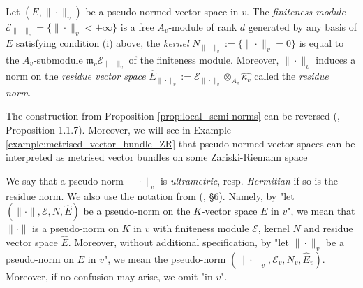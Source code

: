 \documentclass [11pt,reqno]{amsart}
\newcommand{\1}{\mathmybb{1}}
\def\cE{{\mathcal{E}}}
\def\m{\mathfrak m}
\begin{document}
\begin{proposition}
\label{prop:local_semi-norms}
Let $(E,\|\cdot\|_v)$ be a pseudo-normed vector space in $v$. The \emph{finiteness module} $\cE_{\|\cdot\|_{v}}=\{\|\cdot\|_{v}<+\infty\}$ is a free $A_v$-module of rank $d$ generated by any basis of $E$ satisfying condition (i) above, the \emph{kernel} $N_{\|\cdot\|_{v}}:=\{\|\cdot\|_{v}=0\}$ is equal to the $A_v$-submodule $\m_v\cE_{\|\cdot\|_{v}}$ of the finiteness module. Moreover, $\|\cdot\|_{v}$ induces a norm on the \emph{residue vector space} $\widehat{E}_{\|\cdot\|_{v}} := \cE_{\|\cdot\|_{v}} \otimes_{A_v} \widehat{\kappa_v}$ called the \emph{residue norm}.
\end{proposition}

\begin{remark}
\label{rem:pseudo-norm_metrised_vector_bundle}
The construction from Proposition \ref{prop:local_semi-norms} can be reversed (\cite{Sedillot_pav}, Proposition 1.1.7). Moreover, we will see in Example \ref{example:metrised_vector_bundle_ZR} that pseudo-normed vector spaces can be interpreted as metrised vector bundles on some Zariski-Riemann space
\end{remark}

We say that a pseudo-norm $\|\cdot\|_{v}$ is \emph{ultrametric}, resp. \emph{Hermitian} if so is the residue norm. We also use the notation from (\cite{Sedillot_pav}, \S 6). Namely, by "let $(\|\cdot\|,\cE,N,\widehat{E})$ be a pseudo-norm on the $K$-vector space $E$ in $v$", we mean that $\|\cdot\|$ is a pseudo-norm on $K$ in $v$ with finiteness module $\cE$, kernel $N$ and residue vector space $\widehat{E}$. Moreover, without additional specification, by "let $\|\cdot\|_v$ be a pseudo-norm on $E$ in $v$", we mean the pseudo-norm $(\|\cdot\|_v,\cE_v,N_v,\widehat{E}_v)$. Moreover, if no confusion may arise, we omit "in $v$".
\end{document}
